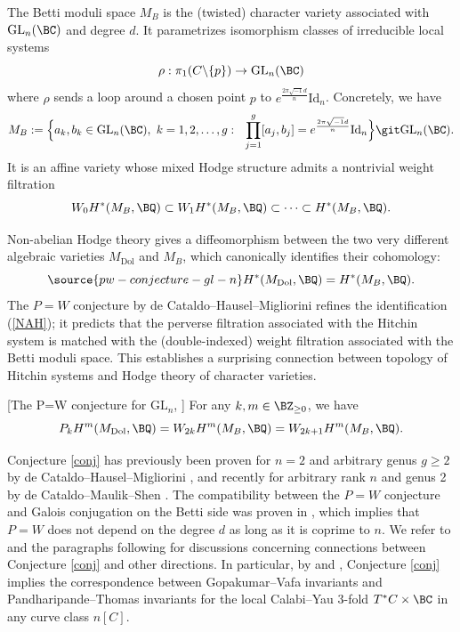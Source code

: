 The Betti moduli space $M_B$ is the (twisted) character variety associated with $\mathrm{GL}_n(\BC)$ and degree $d$.  It parametrizes isomorphism classes of irreducible local systems
\[
\rho: \pi_1(C\backslash \{p\}) \rightarrow \mathrm{GL}_n(\BC)
\]
where $\rho$ sends a loop around a chosen point $p$ to
$e^{\frac{2\pi \sqrt{-1} d}{n}}\mathrm{Id}_n$.  Concretely, we have
\begin{equation*}
M_B := \Big{\{}a_k, b_k \in \mathrm{GL}_n(\BC),~k=1,2,\dots,g: ~~\prod_{j=1}^g [a_j, b_j] = e^{\frac{2\pi \sqrt{-1} d}{n}}\mathrm{Id}_n \Big{\}}\git\mathrm{GL}_n(\BC).
\end{equation*}
It is an affine variety whose mixed Hodge structure admits a nontrivial weight filtration
\[
W_0 H^*(M_B, \BQ) \subset W_1H^*(M_B, \BQ) \subset \cdots \subset H^*(M_B, \BQ).
\]

Non-abelian Hodge theory \cite{Simp,Si1994II} gives a diffeomorphism between the two very different algebraic varieties $M_{\mathrm{Dol}}$ and $M_B$, which canonically identifies their cohomology:
\begin{equation}\label{NAH}
\source{pw-conjecture-gl-n}
 H^*(M_{\mathrm{Dol}}, \BQ)  = H^*(M_{B}, \BQ).
\end{equation}
The $P=W$ conjecture by de Cataldo--Hausel--Migliorini \cite{dCHM1}
refines the identification (\ref{NAH}); it predicts that the perverse filtration associated with the Hitchin system is matched with the (double-indexed) weight filtration associated with the Betti moduli space. This establishes a surprising connection between topology of Hitchin systems and Hodge theory of character varieties.

\begin{conj}
\notready\label{conj}[The P=W conjecture for $\mathrm{GL}_n$, \cite{dCHM1}] For any $k,m\in \BZ_{\geq 0}$, we have
\[
P_kH^m(M_{\mathrm{Dol}}, \BQ) = W_{2k}H^m(M_{B}, \BQ) = W_{2k+1}H^m(M_B, \BQ).
\]
\end{conj}

Conjecture \ref{conj} has previously been proven for $n=2$ and arbitrary genus $g\geq 2$ by de Cataldo--Hausel--Migliorini \cite{dCHM1}, and recently for arbitrary rank $n$ and genus 2 by de Cataldo--Maulik--Shen \cite{dCMS}. The compatibility between the $P=W$ conjecture and Galois conjugation on the Betti side was proven in \cite{dCMSZ}, which implies that $P=W$ does not depend on the degree $d$ as long as it is coprime to $n$. We refer to \cite[Section 1]{dCHM1} and the paragraphs following \cite[Theorem 0.2]{dCMS} for discussions concerning connections between Conjecture \ref{conj} and other directions. In particular, by \cite{CDP} and \cite[Section 9.3]{MT}, Conjecture \ref{conj} implies the correspondence between Gopakumar--Vafa invariants and Pandharipande--Thomas invariants \cite[Conjecture 3.13]{MT} for the local Calabi--Yau 3-fold $T^*C \times \BC$ in any curve class $n[C]$.


